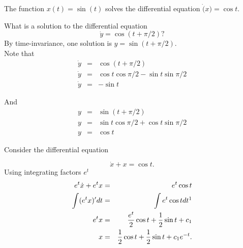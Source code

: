 \begin{example}
  The function $x(t) = \sin (t)$ solves the differential equation
  $\dot(x) = \cos t$.  
\end{example}
What is a solution to the differential equation
\begin{equation*}
  \dot y = \cos (t +\pi /2) ?
\end{equation*}
By time-invariance, one solution is $y=\sin (t+\pi /2)$. \\
Note that
\begin{eqnarray*}
  \dot{y} &=& \cos (t + \pi / 2) \\
  \dot{y} &=& \cos t \cos \pi / 2  - \sin t \sin \pi / 2 \\
  \dot{y} &=& - \sin t 
\end{eqnarray*}

And
\begin{eqnarray*}
  y &=& \sin (t + \pi / 2) \\
  y &=& \sin t \cos  \pi / 2 + \cos t \sin  \pi / 2 \\
  y &=& \cos t 
\end{eqnarray*}

\begin{example}
  Consider the differential equation
\end{example}
\begin{equation*}
  \displaystyle  \dot{x}+x=\cos t.
\end{equation*}
Using integrating factors $e^t$
\begin{eqnarray*}
  e^t \dot{x} + e^t x &=& e^t \cos t \\
  \int (e^t x)' dt &=& \int e^t \cos t dt \footnotemark \\
  e^t x &=& \frac{e^{t}}{2} \cos t + \frac{1}{2} \sin t + c_1  \\
  x &=& \frac{1}{2} \cos t + \frac{1}{2} \sin t + c_1 e^{-t}.
\end{eqnarray*}


